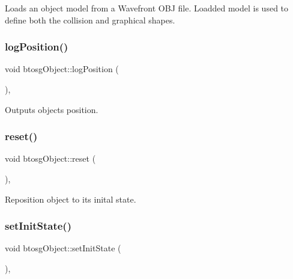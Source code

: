 Loads an object model from a Wavefront O\+BJ file. Loadded model is used to define both the collision and graphical shapes. \mbox{\label{classbtosgObject_acfd70fa6477c80fd7f29ad7ab9f4f067}} 
\subsubsection{\texorpdfstring{log\+Position()}{logPosition()}}
{\footnotesize\ttfamily void btosg\+Object\+::log\+Position (\begin{DoxyParamCaption}{ }\end{DoxyParamCaption})\hspace{0.3cm}{\ttfamily [inline]}, {\ttfamily [inherited]}}

Outputs object\textquotesingle{}s position. \mbox{\label{classbtosgObject_a93983f9180dd0672f8779cf2baa78580}} 
\subsubsection{\texorpdfstring{reset()}{reset()}}
{\footnotesize\ttfamily void btosg\+Object\+::reset (\begin{DoxyParamCaption}{ }\end{DoxyParamCaption})\hspace{0.3cm}{\ttfamily [inline]}, {\ttfamily [inherited]}}

Reposition object to its inital state. \mbox{\label{classbtosgObject_ad1508a0ce28cfac83e5f0ff6245f91b5}} 
\subsubsection{\texorpdfstring{set\+Init\+State()}{setInitState()}\hspace{0.1cm}{\footnotesize\ttfamily [1/2]}}
{\footnotesize\ttfamily void btosg\+Object\+::set\+Init\+State (\begin{DoxyParamCaption}{ }\end{DoxyParamCaption})\hspace{0.3cm}{\ttfamily [inline]}, {\ttfamily [inherited]}}

